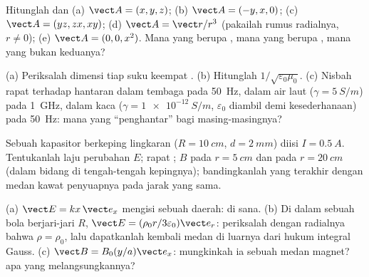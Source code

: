 \begin{exercise}[$\star$]\label{exo:b2:maxwell-equations:1}
Hitunglah  dan  (a) $\vect A = (x, y, z)$; (b)
$\vect A = (-y, x, 0)$; (c) $\vect A = (yz, zx, xy)$; (d) $\vect A = \vect r/r^3$
(pakailah rumus radialnya, $r \ne 0$); (e) $\vect A = (0, 0, x^2)$. Mana yang berupa
, mana yang berupa , mana yang bukan keduanya?
\end{exercise}

\begin{exercise}[$\star$]\label{exo:b2:maxwell-equations:2}
(a) Periksalah dimensi tiap suku keempat .
(b) Hitunglah $1/\sqrt{\varepsilon_0\mu_0}$. (c) Nisbah rapat 
terhadap  hantaran dalam tembaga pada \qty{50}{Hz}, dalam
air laut ($\gamma = \qty{5}{S/m}$) pada \qty{1}{GHz}, dalam kaca ($\gamma =
\qty{1e-12}{S/m}$, $\varepsilon_0$ diambil demi kesederhanaan) pada \qty{50}{Hz}: mana yang
``penghantar'' bagi masing-masingnya?
\end{exercise}

\begin{exercise}[$\star$]\label{exo:b2:maxwell-equations:3}
Sebuah kapasitor berkeping lingkaran ($R = \qty{10}{cm}$, $d = \qty{2}{mm}$)
diisi $I = \qty{0.5}{A}$. Tentukanlah laju perubahan $E$; rapat ; $B$ pada $r = \qty{5}{cm}$ dan pada $r = \qty{20}{cm}$ (dalam
bidang di tengah-tengah kepingnya); bandingkanlah yang terakhir dengan medan
kawat penyuapnya pada jarak yang sama.
\end{exercise}

\begin{exercise}[$\star$]\label{exo:b2:maxwell-equations:4}
(a) $\vect E = kx\,\vect e_x$ mengisi sebuah daerah:  di sana. (b)
Di dalam sebuah bola berjari-jari $R$, $\vect E = (\rho_0r/3\varepsilon_0)\vect e_r$: periksalah dengan
 radialnya bahwa $\rho = \rho_0$, lalu dapatkanlah kembali medan di luarnya
dari hukum integral Gauss. (c) $\vect B = B_0(y/a)\vect e_x$: mungkinkah ia sebuah
medan magnet?  apa yang melangsungkannya?
\end{exercise}

